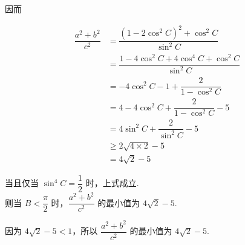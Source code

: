 \documentclass[UTF8]{ctexart}
\newcommand{\lt}{<}
\begin{document}
\noindent 因而

\begin{align*}
\dfrac{a^2+b^2}{c^2} &= \dfrac{(1-2 \cos^2 C)^2+\cos^2 C}{\sin^2 C} \\
&= \dfrac{1-4 \cos^2 C+4 \cos^4 C+\cos^2 C}{\sin^2 C} \\
&= -4 \cos^2 C-1+\dfrac{2}{1-\cos ^2 C} \\
&= 4-4 \cos^2 C+\dfrac{2}{1-\cos^2 C} -5 \\
&= 4 \sin^2 C+\dfrac{2}{\sin^2 C}-5 \\
&\ge 2 \sqrt{4 \times 2}-5 \\
&= 4 \sqrt{2}-5
\end{align*}

\noindent 当且仅当 $\sin^4 C=\dfrac{1}{2}$ 时，上式成立. \\

\noindent 则当 $B \lt \dfrac{\pi}{2}$ 时，$\dfrac{a^2+b^2}{c^2}$ 的最小值为 $4 \sqrt 2-5$.

\noindent 因为 $4 \sqrt 2-5 \lt 1$，所以 $\dfrac{a^2+b^2}{c^2}$ 的最小值为 $4 \sqrt 2-5$.
\end{document}
